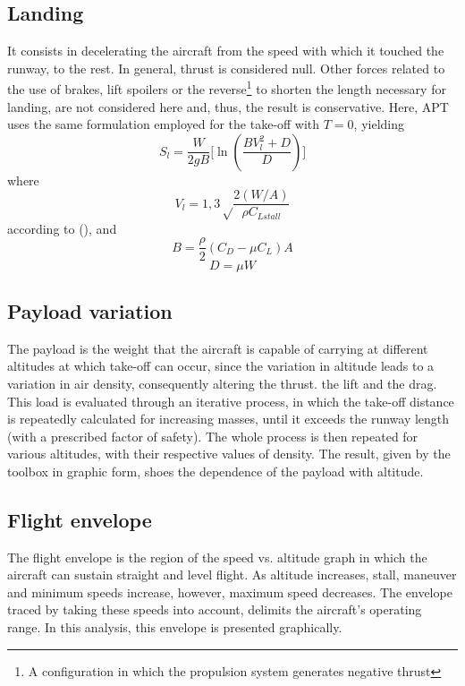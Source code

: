 \documentclass[10pt]{SelfArx} %
\begin{document}
\subsection{Landing}
It consists in decelerating the aircraft from the speed with which it touched the runway, to the rest. In general, thrust is considered null. Other forces related to the use of brakes, lift spoilers or the reverse\footnote{A configuration in which the propulsion system generates negative thrust} to shorten the  length necessary for landing, are not considered here and, thus, the result is conservative. Here, APT uses the same formulation employed for the take-off with $T = 0$, yielding  
\begin{equation} \label{eq: landing} 
S_l = \frac{W }{ 2gB} \Bigg [\ln \left (\frac{BV_l ^ 2 + D }{ D} \right) \Bigg] 
\end{equation} 
where 
\begin{equation} \label{eq: Vl}
V_ {l} = 1,3 \sqrt \frac{2(W / A) }{ \rho C_{Lstall}} 
\end{equation} 
according to (\cite{far}), and 
\begin{equation} \label{eq: landing}
 B = {\frac {\rho} {2} (C_ {D} - \mu C_ {L}) A} 
\end{equation} 
\begin{equation} \label{eq: land} 
D = {\mu W} 
\end{equation}

\subsection{Payload variation}
The payload is the weight that the aircraft is capable of carrying at different altitudes at which take-off can occur, since the variation in altitude leads to a variation in air density, consequently altering the thrust. 
the lift and the drag. This load is evaluated through an iterative process, in which the take-off distance is repeatedly calculated for increasing masses, until it exceeds the runway length (with a prescribed factor of safety).  The whole process is then repeated for various altitudes, with their respective values of  density. The result, given by the toolbox in graphic form, shoes the dependence of the payload with altitude. 

\subsection{Flight envelope}
The flight envelope is the region of the speed vs. altitude graph in which the aircraft can sustain straight and level flight. As altitude increases, stall, maneuver and minimum speeds increase, however, maximum speed decreases. The envelope traced by taking  these speeds into account, delimits the aircraft's operating range. In this analysis, this envelope is presented graphically.
\end{document}
